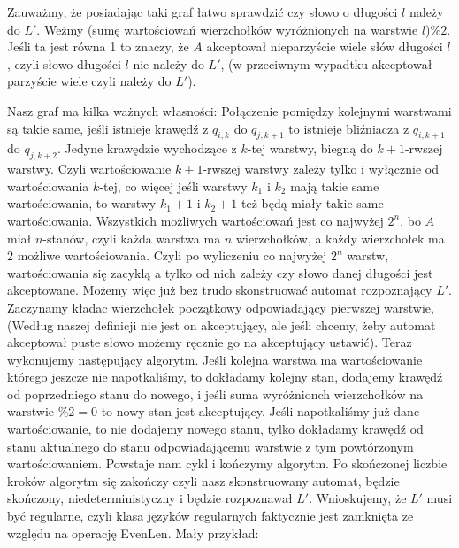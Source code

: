 \documentclass{article}
\begin{document}
Zauważmy, że posiadając taki graf łatwo sprawdzić czy słowo o długości $l$ należy do $L'$. Weźmy (sumę wartościowań wierzchołków wyróżnionych na warstwie $l$)$ \% 2$. Jeśli ta jest równa 1 to znaczy, że $A$ akceptował nieparzyście wiele słów długości $l$, czyli słowo długości $l$ nie należy do $L'$, (w przeciwnym wypadtku akceptował parzyście wiele czyli należy do $L'$). \newline \newline

Nasz graf ma kilka ważnych własności: \newline Połączenie pomiędzy kolejnymi warstwami są takie same, jeśli istnieje krawędź z $q_{i,k}$ do $q_{j,k+1}$ to istnieje bliźniacza z $q_{i,k+1}$ do $q_{j,k+2}$. \newline Jedyne krawędzie wychodzące z $k$-tej warstwy, biegną do $k+1$-rwszej warstwy. \newline 
Czyli wartościowanie $k+1$-rwszej warstwy zależy tylko i wyłącznie od wartościowania $k$-tej, co więcej jeśli warstwy $k_1$ i $k_2$ mają takie same wartościowania, to warstwy $k_1+1$ i $k_2+1$ też będą miały takie same wartościowania. \newline 
Wszystkich możliwych wartościowań jest co najwyżej $2^n$, bo $A$ miał $n$-stanów, czyli każda warstwa ma $n$ wierzchołków, a każdy wierzchołek ma 2 możliwe wartościowania. \newline 
Czyli po wyliczeniu co najwyżej $2^n$ warstw, wartościowania się zacyklą a tylko od nich zależy czy słowo danej długości jest akceptowane. \newline \newline 
Możemy więc już bez trudo skonstruować automat rozpoznający $L'$. \newline \newline 
Zaczynamy kładac wierzchołek początkowy odpowiadający pierwszej warstwie, (Według naszej definicji nie jest on akceptujący, ale jeśli chcemy, żeby automat akceptował puste słowo możemy ręcznie go na akceptujący ustawić). Teraz wykonujemy następujący algorytm. Jeśli kolejna warstwa ma wartościowanie którego jeszcze nie napotkaliśmy, to dokładamy kolejny stan, dodajemy krawędź od poprzedniego stanu do nowego, i jeśli suma wyróżnionch wierzchołków na warstwie $\%2 = 0$ to nowy stan jest akceptujący. \newline 
Jeśli napotkaliśmy już dane wartościowanie, to nie dodajemy nowego stanu, tylko dokładamy krawędź od stanu aktualnego do stanu odpowiadającemu warstwie z tym powtórzonym wartościowaniem. Powstaje nam cykl i kończymy algorytm. \newline Po skończonej liczbie kroków algorytm się zakończy czyli nasz skonstruowany automat, będzie skończony, niedeterministyczny i będzie rozpoznawał $L'$. \newline 
Wnioskujemy, że $L'$ musi być regularne, czyli klasa języków regularnych faktycznie jest zamknięta ze względu na operację EvenLen. \newline \newline
Mały przykład: \newline 
\end{document}
